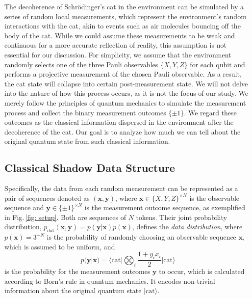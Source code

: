 \documentclass[fleqn,11pt]{wlscirep}
\newcommand{\bra}[1]{\langle #1|}
\newcommand{\ket}[1]{|#1 \rangle}
\newcommand{\vect}[1]{{\bm{#1}}}
\newcommand{\eq}[1]{\begin{equation}#1\end{equation}}
\newcommand{\figref}[1]{Fig.\,\ref{#1}}
\begin{document}
The decoherence of Schrödinger's cat in the environment can be simulated by a series of random local measurements, which represent the environment's random interactions with the cat, akin to events such as air molecules bouncing off the body of the cat. While we could assume these measurements to be weak and continuous for a more accurate reflection of reality, this assumption is not essential for our discussion. For simplicity, we assume that the environment randomly selects one of the three Pauli observables $\{X,Y,Z\}$ for each qubit and performs a projective measurement of the chosen Pauli observable. As a result, the cat state will collapse into certain post-measurement state. We will not delve into the nature of how this process occurs, as it is not the focus of our study. We merely follow the principles of quantum mechanics to simulate the measurement process and collect the binary measurement outcomes $\{\pm 1\}$. We regard these outcomes as the classical information dispersed in the environment after the decoherence of the cat. Our goal is to analyze how much we can tell about the original quantum state from such classical information.

\subsection*{Classical Shadow Data Structure}

Specifically, the data from each random measurement can be represented as a pair of sequences denoted as $(\vect{x},\vect{y})$, where $\vect{x}\in\{X,Y,Z\}^{\times N}$ is the observable sequence and $\vect{y}\in\{\pm1\}^{\times N}$ is the measurement outcome sequence, as exemplified in \figref{fig: setup}. Both are sequences of $N$ tokens. Their joint probability distribution, $p_\text{dat}(\vect{x},\vect{y})=p(\vect{y}|\vect{x})p(\vect{x})$, defines the \emph{data distribution}, where $p(\vect{x})=3^{-N}$ is the probability of randomly choosing an observable sequence $\vect{x}$, which is assumed to be uniform, and
\eq{\label{eq: p(y|x) dat} 
p(\vect{y}|\vect{x})=\bra{\text{cat}}\bigotimes_i\frac{1+y_ix_i}{2}\ket{\text{cat}}} is the probability for the measurement outcomes $\vect{y}$ to occur, which is calculated according to Born's rule in quantum mechanics. It encodes non-trivial information about the original quantum state $\ket{\text{cat}}$.
\end{document}
